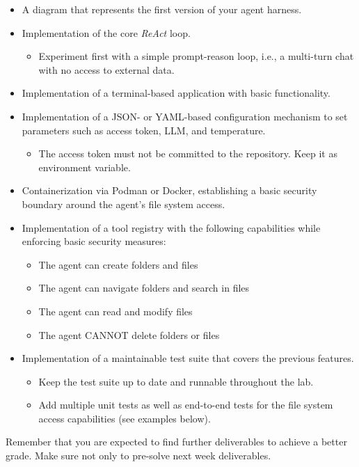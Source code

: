 \documentclass{article}
\begin{document}
\begin{itemize}
    \item A diagram that represents the first version of your agent harness.
    \item Implementation of the core \textit{ReAct} loop.
    \begin{itemize}
        \item Experiment first with a simple prompt-reason loop, i.e., a multi-turn chat with no access to external data.
    \end{itemize}
    \item Implementation of a terminal-based application with basic functionality.
    \item Implementation of a JSON- or YAML-based configuration mechanism to set parameters such as access token, LLM, and temperature.
    \begin{itemize}
        \item The access token must not be committed to the repository. Keep it as environment variable.
    \end{itemize}
    \item Containerization via Podman or Docker, establishing a basic security boundary around the agent's file system access.
    \item Implementation of a tool registry with the following capabilities while enforcing basic security measures:
    \begin{itemize}
        \item The agent can create folders and files
        \item The agent can navigate folders and search in files
        \item The agent can read and modify files
        \item The agent CANNOT delete folders or files
    \end{itemize}
    \item Implementation of a maintainable test suite that covers the previous features.
    \begin{itemize}
        \item Keep the test suite up to date and runnable throughout the lab.
        \item Add multiple unit tests as well as end-to-end tests for the file system access capabilities (see examples below).
    \end{itemize}
\end{itemize}

\noindent Remember that you are expected to find further deliverables to achieve a better grade. Make sure not only to pre-solve next week deliverables.
\end{document}
